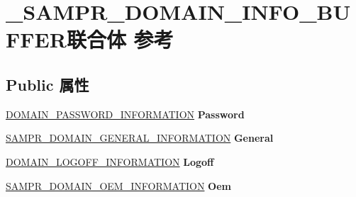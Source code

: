 \hypertarget{union___s_a_m_p_r___d_o_m_a_i_n___i_n_f_o___b_u_f_f_e_r}{}\section{\+\_\+\+S\+A\+M\+P\+R\+\_\+\+D\+O\+M\+A\+I\+N\+\_\+\+I\+N\+F\+O\+\_\+\+B\+U\+F\+F\+E\+R联合体 参考}
\label{union___s_a_m_p_r___d_o_m_a_i_n___i_n_f_o___b_u_f_f_e_r}
\subsection*{Public 属性}
\begin{DoxyCompactItemize}
\item 
\mbox{\label{union___s_a_m_p_r___d_o_m_a_i_n___i_n_f_o___b_u_f_f_e_r_a5791a5f523e410ab9e01508228e0e53b}} 
\hyperlink{struct___d_o_m_a_i_n___p_a_s_s_w_o_r_d___i_n_f_o_r_m_a_t_i_o_n}{D\+O\+M\+A\+I\+N\+\_\+\+P\+A\+S\+S\+W\+O\+R\+D\+\_\+\+I\+N\+F\+O\+R\+M\+A\+T\+I\+ON} {\bfseries Password}
\item 
\mbox{\label{union___s_a_m_p_r___d_o_m_a_i_n___i_n_f_o___b_u_f_f_e_r_a629c9c5f5050014526a69247711c1870}} 
\hyperlink{struct___s_a_m_p_r___d_o_m_a_i_n___g_e_n_e_r_a_l___i_n_f_o_r_m_a_t_i_o_n}{S\+A\+M\+P\+R\+\_\+\+D\+O\+M\+A\+I\+N\+\_\+\+G\+E\+N\+E\+R\+A\+L\+\_\+\+I\+N\+F\+O\+R\+M\+A\+T\+I\+ON} {\bfseries General}
\item 
\mbox{\label{union___s_a_m_p_r___d_o_m_a_i_n___i_n_f_o___b_u_f_f_e_r_a1d651ad3110b0435a5ed11c5a82958a0}} 
\hyperlink{struct___d_o_m_a_i_n___l_o_g_o_f_f___i_n_f_o_r_m_a_t_i_o_n}{D\+O\+M\+A\+I\+N\+\_\+\+L\+O\+G\+O\+F\+F\+\_\+\+I\+N\+F\+O\+R\+M\+A\+T\+I\+ON} {\bfseries Logoff}
\item 
\mbox{\label{union___s_a_m_p_r___d_o_m_a_i_n___i_n_f_o___b_u_f_f_e_r_a1604122c875160c3947af3e977851ef2}} 
\hyperlink{struct___s_a_m_p_r___d_o_m_a_i_n___o_e_m___i_n_f_o_r_m_a_t_i_o_n}{S\+A\+M\+P\+R\+\_\+\+D\+O\+M\+A\+I\+N\+\_\+\+O\+E\+M\+\_\+\+I\+N\+F\+O\+R\+M\+A\+T\+I\+ON} {\bfseries Oem}

\end{DoxyCompactItemize}
